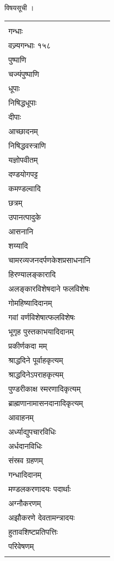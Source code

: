 \documentclass[11pt, openany]{book}
\begin{document}
{{{{{{{{{{{{ विषयसूची ।

\begin{longtable}[]{@{}lll@{}}
\toprule
\endhead
\begin{minipage}[t]{0.30\columnwidth}\raggedright
{विषयः\\
गन्धाः\\
वज्र्यगन्धाः १५८\\
पुष्पाणि\\
चज्यंपुष्पाणि\\
धूपाः\\
निषिद्धधूपाः\\
दीपाः\\
आच्छादनम्\\
निषिद्धवस्त्राणि\\
यज्ञोपवीतम्\\
दण्डयोगपट्ट\\
कमण्डल्वादि\\
छत्रम्\\
उपानत्पादुके\\
आसनानि\\
शय्यादि\\
चामरव्यजनदर्पणकेशप्रसाधनानि\\
हिरण्यालङ्कारादि\\
अलङ्कारविशेषदाने फलविशेषः\\
गोमहिष्यादिदानम्\\
गवां वर्णविशेषात्फलविशेषः\\
भूगृह पुस्तकाभयादिदानम्\\
प्रकीर्णकदा मम्\\
श्राद्धदिने पूर्वाहकृत्यम्\\
श्राद्धदिनेऽपराहकृत्यम्\\
पुण्डरीकाक्ष स्मरणादिकृत्यम्\\
ब्राह्मणानामासनदानादिकृत्यम्\\
आवाहनम्\\
अर्ध्याद्युपचारविधिः\\
अर्धदानविधिः\\
संस्रव ग्रहणम्\\
गन्धादिदानम्\\
मण्डलकरणादयः पदार्थाः\\
अग्नौकरणम्\\
अझौकरणे देवतामन्त्रादयः\\
हुतावशिष्टप्रतिपत्तिः\\
परिवेषणम्}\strut
\end{minipage} & \begin{minipage}[t]{0.30\columnwidth}\raggedright
{पृष्ठसंख्या । विषयः\\
}
\end{minipage}
\end{longtable}}}}}}}}}}}}}
\end{document}
